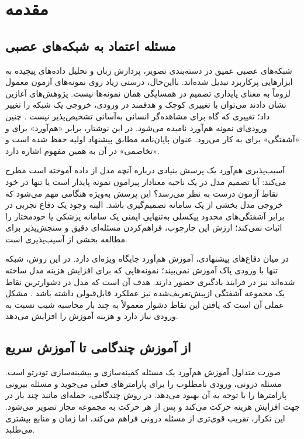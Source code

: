 \chapter{مقدمه}
\label{ch:introduction}

\section{مسئله اعتماد به شبکه‌های عصبی}
شبکه‌های عصبی عمیق در دسته‌بندی تصویر، پردازش زبان و تحلیل داده‌های پیچیده به ابزارهایی پرکاربرد تبدیل شده‌اند. بااین‌حال، درستی زیاد روی نمونه‌های آزمون معمول لزوماً به معنای پایداری تصمیم در همسایگی همان نمونه‌ها نیست. پژوهش‌های آغازین نشان دادند می‌توان با تغییری کوچک و هدفمند در ورودی، خروجی یک شبکه را تغییر داد؛ تغییری که گاه برای مشاهده‌گر انسانی به‌آسانی تشخیص‌پذیر نیست \cite{szegedy2014intriguing,goodfellow2015explaining}. چنین ورودی‌ای نمونه هم‌آورد نامیده می‌شود. در این نوشتار، برابر «هم‌آورد» برای  و «آشفتگی» برای  به کار می‌رود. عنوان پایان‌نامه مطابق پیشنهاد اولیه حفظ شده است و «تخاصمی» در آن به همین مفهوم اشاره دارد.

آسیب‌پذیری هم‌آورد یک پرسش بنیادی درباره آنچه مدل از داده آموخته است مطرح می‌کند: آیا تصمیم مدل در یک ناحیه معنادار پیرامون نمونه پایدار است یا تنها در خود نقاط آزمون درست به نظر می‌رسد؟ این پرسش به‌ویژه هنگامی مهم می‌شود که خروجی مدل بخشی از یک سامانه تصمیم‌گیری باشد. البته وجود یک دفاع تجربی در برابر آشفتگی‌های محدود پیکسلی به‌تنهایی ایمنی یک سامانه پزشکی یا خودمختار را اثبات نمی‌کند؛ ارزش این چارچوب، فراهم‌کردن مسئله‌ای دقیق و سنجش‌پذیر برای مطالعه بخشی از آسیب‌پذیری است.

در میان دفاع‌های پیشنهادی، آموزش هم‌آورد جایگاه ویژه‌ای دارد. در این روش، شبکه تنها با ورودی پاک آموزش نمی‌بیند؛ نمونه‌هایی که برای افزایش هزینه مدل ساخته شده‌اند نیز در فرایند یادگیری حضور دارند. هدف آن است که مدل در دشوارترین نقاط یک مجموعه آشفتگی ازپیش‌تعریف‌شده نیز عملکرد قابل‌قبولی داشته باشد \cite{madry2018towards}. مشکل عملی آن است که یافتن این نقاط دشوار معمولاً به چند بار محاسبه شیب نسبت به ورودی نیاز دارد و هزینه آموزش را افزایش می‌دهد.

\section{از آموزش چندگامی تا آموزش سریع}
صورت متداول آموزش هم‌آورد یک مسئله کمینه‌سازی و بیشینه‌سازی تودرتو است. مسئله درونی، ورودی نامطلوب را برای پارامترهای فعلی می‌جوید و مسئله بیرونی پارامترها را با توجه به آن بهبود می‌دهد. در روش چندگامی، حمله‌ای مانند  چند بار در جهت افزایش هزینه حرکت می‌کند و پس از هر حرکت به مجموعه مجاز تصویر می‌شود. این تکرار، تقریب قوی‌تری از مسئله درونی فراهم می‌کند، اما زمان و منابع بیشتری می‌طلبد.

